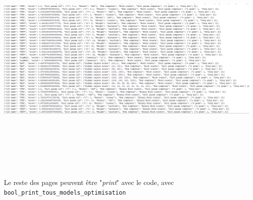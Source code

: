 \includegraphics[width=\linewidth,height=12cm,keepaspectratio]{images/page_1}

Le reste des pages peuvent être "\emph{print}" avec le code, avec \verb|bool_print_tous_models_optimisation|